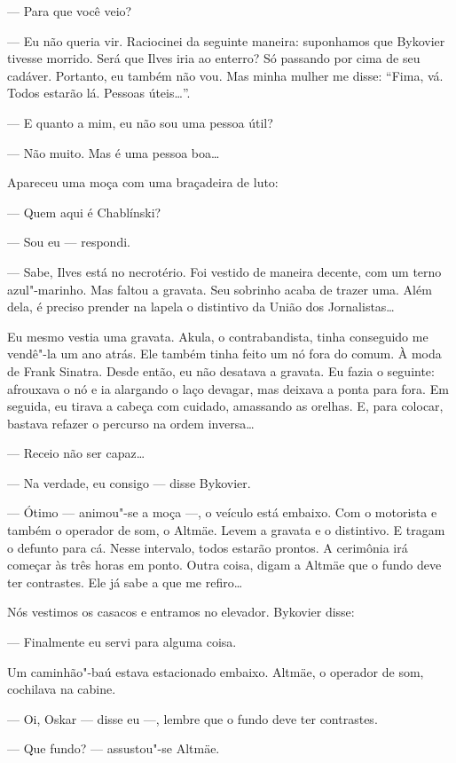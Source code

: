 --- Para que você veio?

--- Eu não queria vir. Raciocinei da seguinte maneira: suponhamos que
Bykovier tivesse morrido. Será que Ilves iria ao enterro? Só passando
por cima de seu cadáver. Portanto, eu também não vou. Mas minha mulher
me disse: ``Fima, vá. Todos estarão lá. Pessoas úteis\ldots{}''.

--- E quanto a mim, eu não sou uma pessoa útil?

--- Não muito. Mas é uma pessoa boa\ldots{}

Apareceu uma moça com uma braçadeira de luto:

--- Quem aqui é Chablínski?

--- Sou eu --- respondi.

--- Sabe, Ilves está no necrotério. Foi vestido de maneira decente, com
um terno azul"-marinho. Mas faltou a gravata. Seu sobrinho acaba de
trazer uma. Além dela, é preciso prender na lapela o distintivo da União
dos Jornalistas\ldots{}

Eu mesmo vestia uma gravata. Akula, o contrabandista, tinha conseguido
me vendê"-la um ano atrás. Ele também tinha feito um nó fora do comum. À
moda de Frank Sinatra. Desde então, eu não desatava a gravata. Eu fazia
o seguinte: afrouxava o nó e ia alargando o laço devagar, mas deixava a
ponta para fora. Em seguida, eu tirava a cabeça com cuidado, amassando
as orelhas. E, para colocar, bastava refazer o percurso na ordem
inversa\ldots{}

--- Receio não ser capaz\ldots{}

--- Na verdade, eu consigo --- disse Bykovier.

--- Ótimo --- animou"-se a moça ---, o veículo está embaixo. Com o
motorista e também o operador de som, o Altmäe. Levem a gravata e o
distintivo. E tragam o defunto para cá. Nesse intervalo, todos estarão
prontos. A cerimônia irá começar às três horas em ponto. Outra coisa,
digam a Altmäe que o fundo deve ter contrastes. Ele já sabe a que me
refiro\ldots{}

Nós vestimos os casacos e entramos no elevador. Bykovier disse:

--- Finalmente eu servi para alguma coisa.

Um caminhão"-baú estava estacionado embaixo. Altmäe, o
operador de som, cochilava na cabine.

--- Oi, Oskar --- disse eu ---, lembre que o fundo deve ter contrastes.

--- Que fundo? --- assustou"-se Altmäe.

